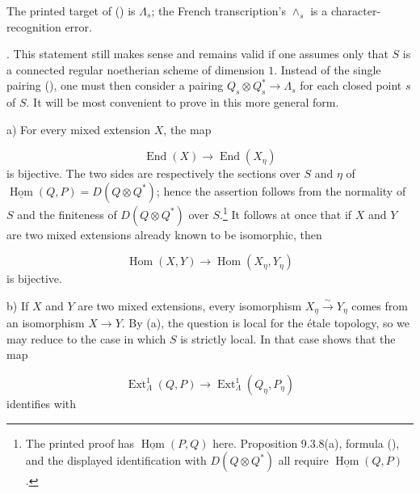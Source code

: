 The printed target of () is $\Lambda_s$; the French transcription's
$\wedge_s$ is a character-recognition error.

\medskip
\noindent
{}. This statement still makes sense and remains valid if one assumes
only that $S$ is a connected regular noetherian scheme of dimension $1$.
Instead of the single pairing (), one must then consider a pairing
$Q_s\otimes Q_s^*\longrightarrow\Lambda_s$ for each closed point $s$ of
$S$. It will be most convenient to prove  in this more general form.

\smallskip
\noindent
a) For every mixed extension $X$, the map

\begin{equation*}
\operatorname{End}(X)\longrightarrow\operatorname{End}(X_\eta)
\end{equation*}
is bijective. The two sides are respectively the sections over $S$ and
$\eta$ of
$\underline{\operatorname{Hom}}(Q,P)=D(Q\otimes Q^*)$; hence the assertion
follows from the normality of $S$ and the finiteness of
$D(Q\otimes Q^*)$ over $S$.\footnote{The printed proof has
$\underline{\operatorname{Hom}}(P,Q)$ here. Proposition 9.3.8(a), formula
(), and the displayed identification with $D(Q\otimes Q^*)$ all
require $\underline{\operatorname{Hom}}(Q,P)$.} It follows at once that if $X$
and $Y$ are two mixed extensions already known to be isomorphic, then

\begin{equation*}
\operatorname{Hom}(X,Y)\longrightarrow
\operatorname{Hom}(X_\eta,Y_\eta)
\end{equation*}
is bijective.

\smallskip
\noindent
b) If $X$ and $Y$ are two mixed extensions, every isomorphism
$X_\eta\xrightarrow{\sim}Y_\eta$ comes from an isomorphism
$X\longrightarrow Y$. By (a), the question is local for the étale
topology, so we may reduce to the case in which $S$ is strictly local. In
that case  shows that the map

\begin{equation*}
\operatorname{Ext}^1_\Lambda(Q,P)
\longrightarrow\operatorname{Ext}^1_\Lambda(Q_\eta,P_\eta)
\end{equation*}
identifies with

